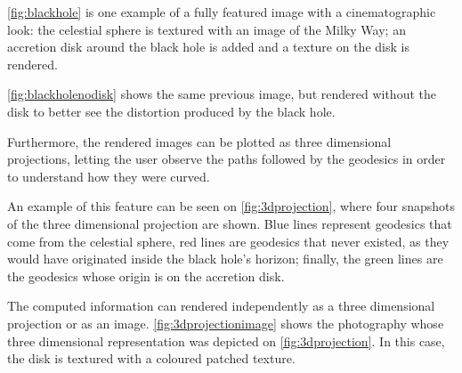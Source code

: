 \autoref{fig:blackhole} is one example of a fully featured image with a cinematographic look: the celestial sphere is textured with an image of the Milky Way; an accretion disk around the black hole is added and a texture on the disk is rendered.

\autoref{fig:blackholenodisk} shows the same previous image, but rendered without the disk to better see the distortion produced by the black hole.

Furthermore, the rendered images can be plotted as three dimensional projections, letting the user observe the paths followed by the geodesics in order to understand how they were curved.

An example of this feature can be seen on \autoref{fig:3dprojection}, where four snapshots of the three dimensional projection are shown. Blue lines represent geodesics that come from the celestial sphere, red lines are geodesics that never existed, as they would have originated inside the black hole's horizon; finally, the green lines are the geodesics whose origin is on the accretion disk.

The computed information can rendered independently as a three dimensional projection or as an image. \autoref{fig:3dprojectionimage} shows the photography whose three dimensional representation was depicted on \autoref{fig:3dprojection}. In this case, the disk is textured with a coloured patched texture.

